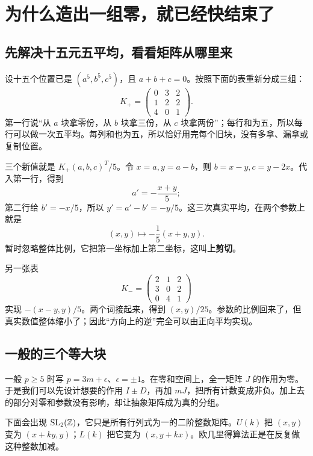 \chapter{为什么造出一组零，就已经快结束了}\label{sec:blocks}
\section{先解决十五元五平均，看看矩阵从哪里来}
设十五个位置已是 $(a^5,b^5,c^5)$，且 $a+b+c=0$。按照下面的表重新分成三组：
\[
K_+=\begin{pmatrix}0&3&2\\1&2&2\\4&0&1\end{pmatrix}.
\]
第一行说“从 $a$ 块拿零份，从 $b$ 块拿三份，从 $c$ 块拿两份”；每行和为五，所以每行可以做一次五平均。每列和也为五，所以恰好用完每个旧块，没有多拿、漏拿或复制位置。

三个新值就是 $K_+(a,b,c)^T/5$。令 $x=a,y=a-b$，则 $b=x-y,c=y-2x$。代入第一行，得到
\[a'=-\frac{x+y}{5};
\]
第二行给 $b'=-x/5$，所以 $y'=a'-b'=-y/5$。这三次真实平均，在两个参数上就是
\[(x,y)\longmapsto-\frac15(x+y,y).
\]
暂时忽略整体比例，它把第一坐标加上第二坐标，这叫\textbf{上剪切}。

另一张表
\[K_-=\begin{pmatrix}2&1&2\\3&0&2\\0&4&1\end{pmatrix}
\]
实现 $-(x-y,y)/5$。两个词接起来，得到 $(x,y)/25$。参数的比例回来了，但真实数值整体缩小了；因此“方向上的逆”完全可以由正向平均实现。

\section{一般的三个等大块}
一般 $p\ge5$ 时写 $p=3m+\epsilon$、$\epsilon=\pm1$。在零和空间上，全一矩阵 $J$ 的作用为零。于是我们可以先设计想要的作用 $I\pm D$，再加 $mJ$，把所有计数变成非负。加上去的部分对零和参数没有影响，却让抽象矩阵成为真的分组。

下面会出现 $\operatorname{SL}_2(\mathbb Z)$，它只是所有行列式为一的二阶整数矩阵。$U(k)$ 把 $(x,y)$ 变为 $(x+ky,y)$；$L(k)$ 把它变为 $(x,y+kx)$。欧几里得算法正是在反复做这种整数加减。

